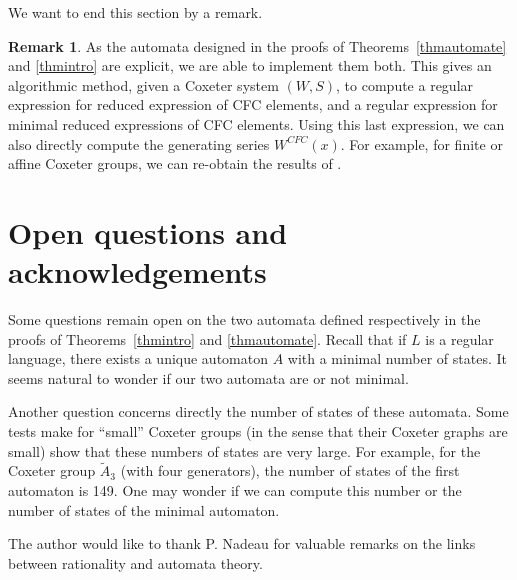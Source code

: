 \documentclass[reqno,12pt]{amsart}
\theoremstyle{definition}
\newtheorem{Remark}[Theorem]{Remark}
\begin{document}
We want to end this section by a remark.

\begin{Remark} As the automata designed in the proofs of Theorems~\ref{thmautomate} and \ref{thmintro} are explicit, we are able to implement them both. This gives an algorithmic method, given a Coxeter system $(W,S)$, to compute a regular expression for reduced expression of CFC elements, and a regular expression for minimal reduced expressions of CFC elements. Using this last expression, we can also directly compute the generating series $W^{CFC}(x)$. For example, for finite or affine Coxeter groups, we can re-obtain the results of \cite{PET4}.

\end{Remark}
\section{Open questions and acknowledgements}\label{section4}

Some questions remain open on the two automata defined respectively in the proofs of Theorems~\ref{thmintro} and \ref{thmautomate}. Recall that if $L$ is a regular language, there exists a unique automaton $A$ with a minimal number of states. It seems natural to wonder if our two automata are or not minimal. 

Another question concerns directly the number  of states of these automata. Some tests make for ``small'' Coxeter groups (in the sense that their Coxeter graphs are small) show that these numbers of states are very large. For example, for the Coxeter group $\widetilde{A}_3$ (with four generators), the number of states of the first automaton is 149. One may wonder if we can compute this number or the number of states of the minimal automaton.

\medskip

The author would like to thank P. Nadeau for valuable remarks on the links between rationality and automata theory.








\end{document}

